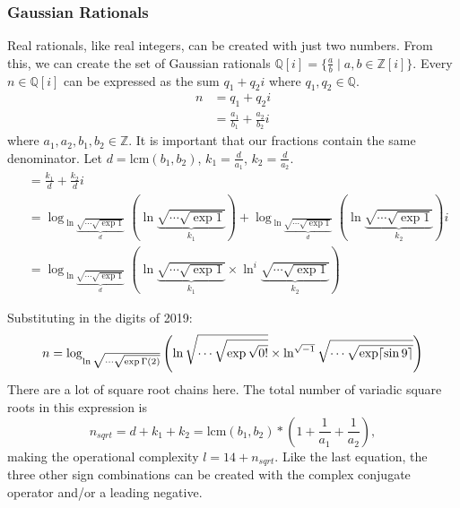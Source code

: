 \subsubsection{Gaussian Rationals}
Real rationals, like real integers, can be created with just two numbers.
From this, we can create the set of Gaussian rationals $\mathbb{Q}[i]=\{\frac{a}{b}\mid a,b\in\mathbb{Z}[i]\}$.
Every $n\in\mathbb{Q}[i]$ can be expressed as the sum $q_1+q_2i$ where $q_1,q_2\in\mathbb{Q}$.
\begin{align*}
  n &= q_1+q_2i \\
  &= \frac{a_1}{b_1} + \frac{a_2}{b_2}i
\end{align*}
where $a_1, a_2, b_1, b_2\in\mathbb{Z}$.
It is important that our fractions contain the same denominator.
Let $d=\textrm{lcm}(b_1, b_2)$, $k_1=\frac{d}{a_1}$, $k_2=\frac{d}{a_2}$.
\begin{align*}
  &= \frac{k_1}{d} + \frac{k_2}{d}i \\
  &= \log_{
      \ln \underbrace{\sqrt{\cdots\sqrt{\exp1}}}_{d}
    }
    \left(
      \ln \underbrace{\sqrt{\cdots\sqrt{\exp1}}}_{k_1}
    \right) +
    \log_{
      \ln \underbrace{\sqrt{\cdots\sqrt{\exp1}}}_{d}
    }
    \left(
      \ln \underbrace{\sqrt{\cdots\sqrt{\exp1}}}_{k_2}
    \right)i \\
  &= \log_{
      \ln \underbrace{\sqrt{\cdots\sqrt{\exp1}}}_{d}
    }
    \left(
      \ln \underbrace{\sqrt{\cdots\sqrt{\exp1}}}_{k_1}
      \times
      \ln^{i} \underbrace{\sqrt{\cdots\sqrt{\exp1}}}_{k_2}
    \right)
\end{align*}

Substituting in the digits of 2019:
\begin{equation}
  n = \log_{\ln \sqrt{\cdots\sqrt{\exp\Gamma(2)}}}
    \left(
      \ln \sqrt{\cdots\sqrt{\exp\sqrt{0!}}}
      \times
      \ln^{\sqrt{-1}} \sqrt{\cdots\sqrt{\exp\lceil\sin9\rceil}}
    \right)
\end{equation}
There are a lot of square root chains here.
The total number of variadic square roots in this expression is
\begin{equation*}
  n_{sqrt}=d+k_1+k_2=\textrm{lcm}(b_1,b_2) * \left(1+\frac{1}{a_1}+\frac{1}{a_2}\right),
\end{equation*}
making the operational complexity $l=14+n_{sqrt}$.
Like the last equation, the three other sign combinations can be created with the complex conjugate operator and/or a leading negative.
